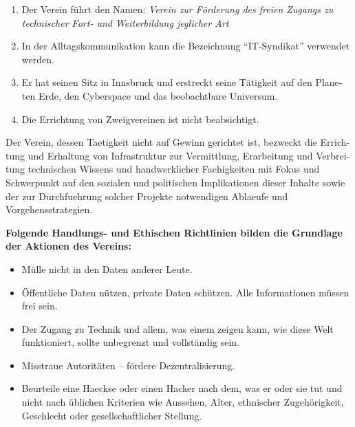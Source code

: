 \begin{otherlanguage}{german}

\selectfont\tiny


\begin{enumerate}[statutenenum]
    \item Der Verein führt den Namen: \textit{Verein zur Förderung des freien Zugangs zu technischer Fort- und Weiterbildung jeglicher Art}
    \item In der Alltagskommunikation kann die Bezeichnung
      ``IT-Syndikat'' verwendet werden.

    \item Er hat seinen Sitz in Innsbruck und erstreckt seine Tätigkeit auf den Planeten Erde, den Cyberspace und das beobachtbare Universum.

    \item Die Errichtung von Zweigvereinen ist nicht beabsichtigt.
\end{enumerate}


Der Verein, dessen Taetigkeit nicht auf Gewinn gerichtet ist, bezweckt die Errichtung und Erhaltung von Infrastruktur zur Vermittlung, Erarbeitung und Verbreitung technischen Wissens und handwerklicher Faehigkeiten mit Fokus und Schwerpunkt auf den sozialen und politischen Implikationen dieser Inhalte sowie der zur Durchfuehrung solcher Projekte notwendigen Ablaeufe und Vorgehensstrategien.

\textbf{Folgende Handlungs- und Ethischen Richtlinien bilden die Grundlage der Aktionen des Vereins:}

\begin{itemize}[statutenenum]
    \item Mülle nicht in den Daten anderer Leute.

    \item Öffentliche Daten nützen, private Daten schützen.
        Alle Informationen müssen frei sein.

    \item Der Zugang zu Technik und allem, was einem zeigen kann, wie diese Welt funktioniert, sollte unbegrenzt und vollständig sein.

    \item Misstraue Autoritäten -- fördere Dezentralisierung.

    \item Beurteile eine Haeckse oder einen Hacker nach dem, was er oder sie tut und nicht nach üblichen Kriterien wie Aussehen, Alter, ethnischer Zugehörigkeit, Geschlecht oder gesellschaftlicher Stellung.


\end{itemize}
\end{otherlanguage}
